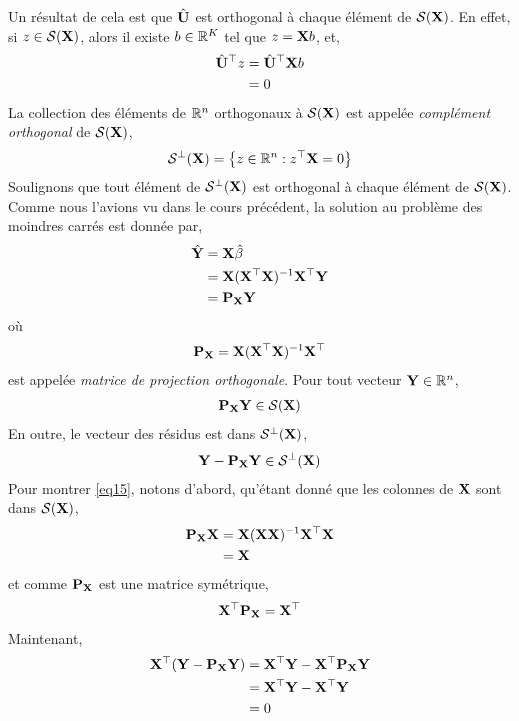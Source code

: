 Un  résultat de cela est que $\hat{\mathbf U}$ est orthogonal à chaque élément de $\mathcal{S}(\mathbf X)$. En effet, si $z\in \mathcal{S}(\mathbf X)$, alors il existe $b\in\mathbb{R}^K$ tel que $z=\mathbf X b$, et,
\begin{align*}
\hat{\mathbf U}^\top z &= \hat{\mathbf U}^\top\mathbf X b\\
& = 0
\end{align*}
La collection des éléments de $\mathbb{R}^n$ orthogonaux à $\mathcal{S}(\mathbf X)$ est appelée \emph{complément orthogonal} de $\mathcal{S}(\mathbf X)$,
\begin{align*}
\mathcal{S}^\perp(\mathbf X) = \left\{z \in \mathbb{R}^n: z^\top\mathbf X=0\right\}
\end{align*}
Soulignons que tout élément de $\mathcal{S}^\perp(\mathbf X)$ est orthogonal à chaque élément de $\mathcal{S}(\mathbf X)$.\\
Comme nous l'avions vu dans le cours précédent, la solution au problème des moindres carrés est donnée par,
\begin{align*}
\hat{\mathbf Y} &= \mathbf X\hat{\beta}\\
&=\mathbf X(\mathbf X^\top\mathbf X)^{-1}\mathbf X^\top\mathbf Y\\
&=\mathbf P_{\mathbf X}\mathbf Y
\end{align*}
où 
\begin{align*} \mathbf P_{\mathbf X} = \mathbf X(\mathbf X^\top\mathbf X)^{-1}\mathbf X^\top
\end{align*}
est appelée \emph{matrice de projection orthogonale}. Pour tout vecteur $\mathbf Y\in\mathbb{R}^n$,
\begin{align*}
\mathbf P_{\mathbf X}\mathbf Y \in \mathcal{S}(\mathbf X)
\end{align*}
En outre, le vecteur des résidus est dans  $\mathcal{S}^\perp(\mathbf X)$,
\begin{align}
\mathbf Y - \mathbf P_{\mathbf X}\mathbf Y \in \mathcal{S}^\perp(\mathbf X)
\label{eq15}
\end{align}
Pour montrer \eqref{eq15}, notons d'abord, qu'étant donné que les colonnes de $\mathbf X$ sont dans $\mathcal{S}(\mathbf X)$,
\begin{align*}
\mathbf P_\mathbf X\mathbf X &= \mathbf X(\mathbf X\mathbf X)^{-1}\mathbf X^\top\mathbf X\\
&=\mathbf X
\end{align*}
et comme $\mathbf P_\mathbf X$ est une matrice symétrique,
\begin{align*}
\mathbf X^\top\mathbf P_\mathbf X = \mathbf X^\top
\end{align*}
Maintenant,
\begin{align*}
\mathbf X^\top(\mathbf Y - \mathbf P_\mathbf X\mathbf Y) &= \mathbf X^\top\mathbf Y-\mathbf X^\top\mathbf P_\mathbf X\mathbf Y\\
& = \mathbf X^\top\mathbf Y-\mathbf X^\top\mathbf Y\\
&=0 
\end{align*}
